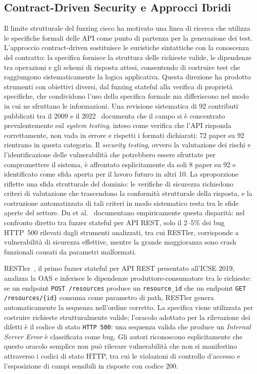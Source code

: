 \subsection{Contract-Driven Security e Approcci Ibridi}\label{subsec:contract-driven}

Il limite strutturale del fuzzing cieco ha motivato una linea di ricerca che utilizza le specifiche formali delle \gls{API} come punto di partenza per la generazione dei test. L'approccio contract-driven sostituisce le euristiche sintattiche con la conoscenza del contratto: la specifica fornisce la struttura delle richieste valide, le dipendenze tra operazioni e gli schemi di risposta attesi, consentendo di costruire test che raggiungono sistematicamente la logica applicativa. Questa direzione ha prodotto strumenti con obiettivi diversi, dal fuzzing stateful alla verifica di proprietà specifiche, che condividono l'uso della specifica formale ma differiscono nel modo in cui ne sfruttano le informazioni. Una revisione sistematica di 92 contributi pubblicati tra il 2009 e il 2022~\cite{golmohammadiTestingRESTfulAPIs2023} documenta che il campo si è concentrato prevalentemente sul \emph{system testing}, inteso come verifica che l'\gls{API} risponda correttamente, non vada in errore e rispetti i formati dichiarati: 72 paper su 92 rientrano in questa categoria. Il \emph{security testing}, ovvero la valutazione dei rischi e l'identificazione delle vulnerabilità che potrebbero essere sfruttate per compromettere il sistema, è affrontato esplicitamente da soli 8 paper su 92 e identificato come sfida aperta per il lavoro futuro in altri 10. La sproporzione riflette una sfida strutturale del dominio: le verifiche di sicurezza richiedono criteri di valutazione che trascendono la conformità strutturale della risposta, e la costruzione automatizzata di tali criteri in modo sistematico resta tra le sfide aperte del settore. Du et al.~\cite{duVulnerabilityorientedTestingRESTful2024} documentano empiricamente questa disparità: nel confronto diretto tra fuzzer stateful per \gls{API} REST, solo il 2--5\% dei bug HTTP~500 rilevati dagli strumenti analizzati, tra cui RESTler, corrisponde a vulnerabilità di sicurezza effettive, mentre la grande maggioranza sono crash funzionali causati da parametri malformati.

RESTler~\cite{atlidakisRESTlerStatefulREST2019a},
il primo fuzzer stateful per \gls{API} \gls{REST} presentato all'ICSE 2019, analizza la \gls{OAS} e inferisce le dipendenze produttore-consumatore tra le richieste: se un endpoint \texttt{POST /resources} produce un \texttt{resource\_id} che un endpoint \texttt{GET /resources/\{id\}} consuma come parametro di path, RESTler genera automaticamente la sequenza nell'ordine corretto. La specifica viene utilizzata per costruire richieste strutturalmente valide; l'oracolo adottato per la rilevazione dei difetti è il codice di stato \texttt{HTTP 500}: una sequenza valida che produce un \emph{Internal Server Error} è classificata come bug. Gli autori riconoscono esplicitamente che questo oracolo semplice non può rilevare vulnerabilità che non si manifestino attraverso i codici di stato \gls{HTTP}, tra cui le violazioni di controllo d'accesso e l'esposizione di campi sensibili in risposte con codice 200.

